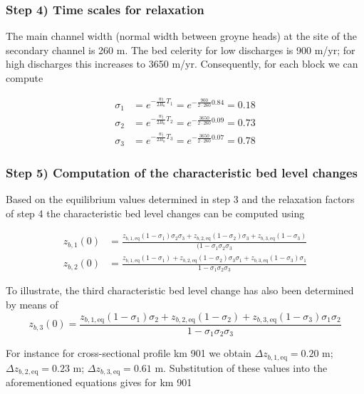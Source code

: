 \subsubsection*{Step 4) Time scales for relaxation}

The main channel width (normal width between groyne heads) at the site of the secondary channel is 260 m.
The bed celerity for low discharges is 900 m/yr; for high discharges this increases to 3650 m/yr.
Consequently, for each block we can compute

\begin{align}
\sigma_1 &= e^{-\frac{w_l}{2B_n}T_1} = e^{-\frac{900}{2 \cdot 260} 0.84} = 0.18 \\
\sigma_2 &= e^{-\frac{w_l}{2B_n}T_2} = e^{-\frac{3650}{2 \cdot 260} 0.09} = 0.73 \\
\sigma_3 &= e^{-\frac{w_l}{2B_n}T_3} = e^{-\frac{3650}{2 \cdot 260} 0.07} = 0.78
\end{align}

\subsubsection*{Step 5) Computation of the characteristic bed level changes}

Based on the equilibrium values determined in step 3 and the relaxation factors of step 4 the characteristic bed level changes can be computed using

\begin{align}
z_{b,1}(0) &= \frac{z_{b,1,\text{eq}} (1-\sigma_1) \sigma_2 \sigma_3 + z_{b,2,\text{eq}} (1-\sigma_2) \sigma_3 + z_{b,3,\text{eq}} (1-\sigma_3)}{(1 - \sigma_1 \sigma_2 \sigma_3} \\
z_{b,2}(0) &= \frac{z_{b,1,\text{eq}} (1-\sigma_1) + z_{b,2,\text{eq}} (1-\sigma_2) \sigma_3 \sigma_1 + z_{b,3,\text{eq}} (1-\sigma_3) \sigma_1}{1 - \sigma_1 \sigma_2 \sigma_3}
\end{align}

To illustrate, the third characteristic bed level change has also been determined by means of
%
\begin{equation}
z_{b,3}(0) = \frac{z_{b,1,\text{eq}} (1-\sigma_1) \sigma_2 + z_{b,2,\text{eq}} (1-\sigma_2) + z_{b,3,\text{eq}} (1-\sigma_3) \sigma_1 \sigma_2}{1 - \sigma_1 \sigma_2 \sigma_3}
\end{equation}

For instance for cross-sectional profile km 901 we obtain $\Delta z_{b,1,\text{eq}} = 0.20$ m; $\Delta z_{b,2,\text{eq}} = 0.23$ m; $\Delta z_{b,3,\text{eq}} = 0.61$ m.
Substitution of these values into the aforementioned equations gives for km 901


